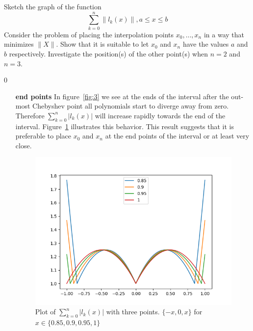 \newpage

\begin{problem}
  Sketch the graph of the function
  \begin{equation*}
    \sum_{k=0}^n\|l_k(x)\|, a \leq x \leq b
  \end{equation*}
  Consider the problem of placing the interpolation points ${x_0,
  \dots, x_n }$ in a way that minimizes $\|X\|$. Show that it is
  suitable to let $x_0$ and $x_n$ have the values $a$ and $b$
  respectively. Investigate the position(s) of the other point(s) when
  $n = 2$ and $n = 3$.
\end{problem}
0

\begin{solution}
  \begin{enumerate}
  \item[{\bf end points}] In figure~\ref{fig:3} we see at the ends of
    the interval after the out-most Chebyshev point all polynomials
    start to diverge away from zero. Therefore
    $\sum_{k=0}^n|l_k(x)|$ will increase rapidly towards the end
    of the interval. Figure~\ref{fig:4edge} illustrates this
    behavior. This result suggests that it is preferable to place
    $x_0$ and $x_n$ at the end points of the interval or at least
    very close.

    \begin{figure}[!ht]
      \centering 
      \includegraphics[scale = 0.5]{code/task_4_edge.png}
      \caption{Plot of $\sum_{k=0}^n|l_k(x)|$ with three points. $\{-x,
        0, x\}$ for $x \in \{0.85, 0.9, 0.95, 1\}$}
      \label{fig:4edge}
    \end{figure}


\end{enumerate}
\end{solution}
